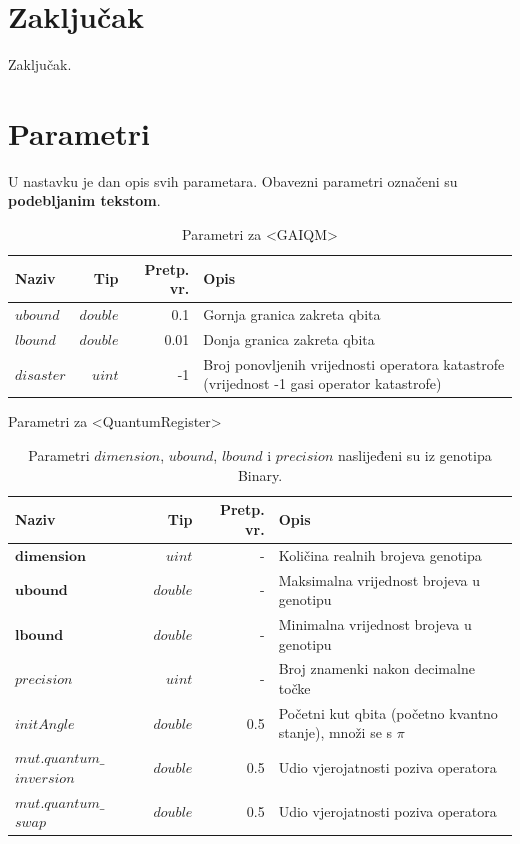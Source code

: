 \documentclass[times, utf8, zavrsni]{fer}
\begin{document}
\chapter{Zaključak}
Zaključak.




\appendix
\chapter{Parametri}
U nastavku je dan opis svih parametara. Obavezni parametri označeni su \textbf{podebljanim tekstom}.

\begin{table}[htb]
\caption{Parametri za <GAIQM>}
\label{tbl:param_gaiqm}
\centering
\begin{tabular}{|p{2cm}|r|r|p{8cm}|} \hline
Naziv & Tip & Pretp. vr. & Opis\\ \hline
$ubound$ & $double$ & 0.1 & Gornja granica zakreta qbita \\
$lbound$ & $double$ & 0.01 & Donja granica zakreta qbita \\
$disaster$ & $uint$ & -1 & Broj ponovljenih vrijednosti operatora katastrofe (vrijednost -1 gasi operator katastrofe) \\ \hline
\end{tabular}
\end{table}

\begin{table}[htb]
\caption{Parametri za <QuantumRegister>}
\label{tbl:param_kvareg}
\centering
\caption*{\footnotesize Parametri $dimension$, $ubound$, $lbound$ i $precision$ naslijeđeni su iz genotipa Binary.}
\begin{tabular}{|p{3cm}|r|r|p{7cm}|} \hline
Naziv & Tip & Pretp. vr. & Opis\\ \hline
$\textbf{dimension}$ & $uint$ & - & Količina realnih brojeva genotipa \\
$\textbf{ubound}$ & $double$ & - & Maksimalna vrijednost brojeva u genotipu \\
$\textbf{lbound}$ & $double$ & - & Minimalna vrijednost brojeva u genotipu \\
$precision$ & $uint$ & - & Broj znamenki nakon decimalne točke \\
$initAngle$ & $double$ & 0.5 & Početni kut qbita (početno kvantno stanje), množi se s $\pi$ \\
$mut.quantum\_$ $inversion$ & $double$ & 0.5 & Udio vjerojatnosti poziva operatora \\
$mut.quantum\_$ $swap$ & $double$ & 0.5 & Udio vjerojatnosti poziva operatora \\ \hline
\end{tabular}
\end{table}
\end{document}
